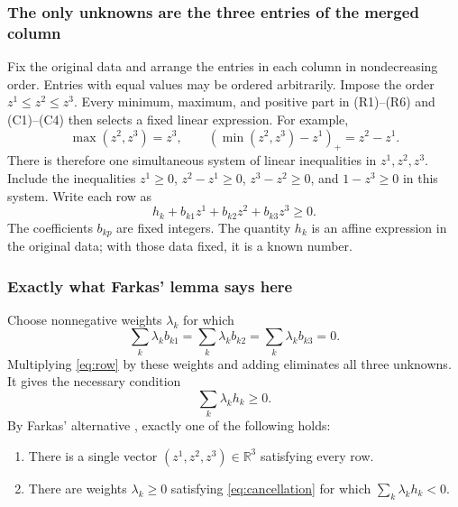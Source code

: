 \documentclass[a4paper,11pt]{amsart}
\numberwithin{equation}{section}
\theoremstyle{definition}
\theoremstyle{remark}
\newcommand{\R}{\mathbb R}
\begin{document}
\subsubsection{The only unknowns are the three entries of the merged column}
Fix the original data and arrange the entries in each column in
nondecreasing order. Entries with equal values may be ordered arbitrarily. Impose the order $z^1\le z^2\le z^3$. Every minimum, maximum,
and positive part in (R1)--(R6) and (C1)--(C4) then selects a fixed linear
expression. For example,
\[
 \max(z^2,z^3)=z^3,\qquad
 (\min(z^2,z^3)-z^1)_+=z^2-z^1.
\]
There is therefore one simultaneous system of linear inequalities in
$z^1,z^2,z^3$. Include the inequalities
$z^1\ge0$, $z^2-z^1\ge0$, $z^3-z^2\ge0$, and $1-z^3\ge0$ in this system.
Write each row as
\begin{equation}\label{eq:row}
 h_k+b_{k1}z^1+b_{k2}z^2+b_{k3}z^3\ge0.
\end{equation}
The coefficients $b_{kp}$ are fixed integers. The quantity $h_k$ is an affine
expression in the original data; with those data fixed, it is a known number.


\subsubsection{Exactly what Farkas' lemma says here}
Choose nonnegative weights $\lambda_k$ for which
\begin{equation}\label{eq:cancellation}
 \sum_k\lambda_k b_{k1}=\sum_k\lambda_k b_{k2}
 =\sum_k\lambda_k b_{k3}=0.
\end{equation}
Multiplying \eqref{eq:row} by these weights and adding eliminates all three
unknowns. It gives the necessary condition
\begin{equation}\label{eq:projected}
 \sum_k\lambda_k h_k\ge0.
\end{equation}
By Farkas' alternative \cite[Corollary~7.1e]{Schrijver1986},
exactly one of the following holds:
\begin{enumerate}
\item There is a single vector $(z^1,z^2,z^3)\in\R^3$ satisfying every row.
\item There are weights $\lambda_k\ge0$ satisfying \eqref{eq:cancellation}
      for which $\sum_k\lambda_kh_k<0$.
\end{enumerate}
\end{document}
